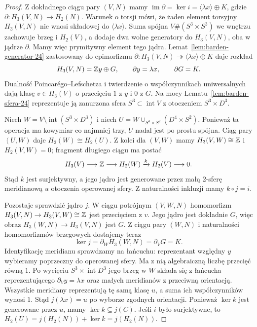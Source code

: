 \begin{proof}
Z dokładnego ciągu pary $(V,N)$ mamy
$\operatorname{im}\partial=\ker i
=\langle\lambda x\rangle\oplus K$,
gdzie $\partial\colon H_3(V,N)\to H_2(N)$.
Warunek o torsji mówi, że żaden element
torsyjny $H_3(V,N)$ nie wnosi składowej
do $\langle\lambda x\rangle$.
Suma spójna $V\#(S^3\times S^3)$
we wnętrzu zachowuje brzeg i $H_2(V)$,
a dodaje dwa wolne generatory do
$H_3(V,N)$, oba w jądrze $\partial$.
Mamy więc prymitywny element tego jądra.
Lemat~\ref{lem:barden-generator-24}
zastosowany do epimorfizmu
$\partial\colon H_3(V,N)\twoheadrightarrow
\langle\lambda x\rangle\oplus K$
daje rozkład
\[
 H_3(V,N)=\mathbb{Z} y\oplus G,
 \qquad \partial y=\lambda x,
 \qquad \partial G=K.
\]
Dualność Poincarégo--Lefschetza i
twierdzenie o współczynnikach
uniwersalnych dają klasę
$v\in H_3(V)$ o przecięciu $1$ z $y$
i $0$ z $G$. Na mocy
Lematu~\ref{lem:barden-sfera-24}
reprezentuje ją zanurzona sfera
$S^3\subset\operatorname{int}V$
z otoczeniem $S^3\times D^3$.

Niech $W=V\setminus\operatorname{int}
(S^3\times D^3)$ i niech
$U=W\cup_{S^3\times S^2}(D^4\times S^2)$.
Ponieważ ta operacja ma kowymiar
co najmniej trzy, $U$ nadal jest
po prostu spójna. Ciąg pary $(U,W)$
daje $H_2(W)\cong H_2(U)$.
Z kolei dla $(V,W)$ mamy
$H_3(V,W)\cong\mathbb{Z}$ i $H_2(V,W)=0$;
fragment długiego ciągu ma postać
\[
 H_3(V)\longrightarrow\mathbb{Z}
 \longrightarrow H_2(W)
 \xrightarrow{k}H_2(V)\longrightarrow0.
\]
Stąd $k$ jest surjektywny, a jego
jądro jest generowane przez małą
$2$-sferę meridianową $u$ otoczenia
operowanej sfery. Z naturalności
inkluzji mamy $k\circ j=i$.

Pozostaje sprawdzić jądro $j$.
W ciągu potrójnym $(V,W,N)$
homomorfizm
$H_3(V,N)\to H_3(V,W)\cong\mathbb{Z}$
jest przecięciem z $v$.
Jego jądro jest dokładnie $G$,
więc obraz $H_3(W,N)\to H_3(V,N)$
jest $G$. Z ciągu pary $(W,N)$
i naturalności homomorfizmów
brzegowych dostajemy teraz
\[
 \ker j=\partial_W H_3(W,N)
       =\partial_V G=K.
\]
Identyfikację meridianu sprawdzamy
na łańcuchu: reprezentant względny
$y$ wybieramy poprzeczny do operowanej
sfery. Ma z nią algebraiczną liczbę
przecięć równą $1$. Po wycięciu
$S^3\times\operatorname{int}D^3$
jego brzeg w $W$ składa się z
łańcucha reprezentującego
$\partial_Vy=\lambda x$ oraz
małych meridianów z przeciwną
orientacją. Wszystkie meridiany
reprezentują tę samą klasę $u$,
a suma ich współczynników wynosi $1$.
Stąd $j(\lambda x)=u$ po wyborze
zgodnych orientacji.
Ponieważ $\ker k$ jest generowane
przez $u$, mamy $\ker k\subseteq j(C)$.
Jeśli $i$ było surjektywne, to
$H_2(U)=j(H_2(N))+\ker k=j(H_2(N))$.
\end{proof}

